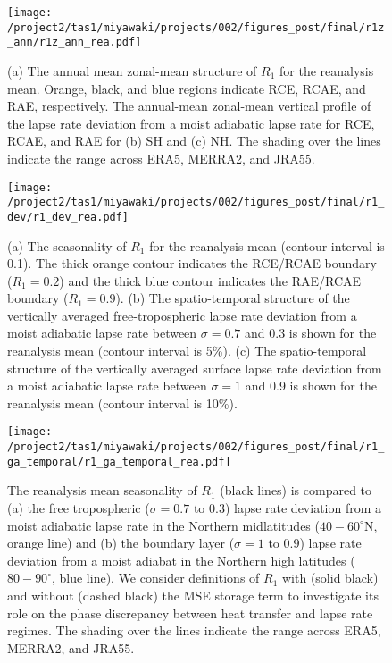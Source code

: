 \documentclass{ametsocV5}
\begin{document}
\begin{figure}[t]
  \noindent\texttt{[image: /project2/tas1/miyawaki/projects/002/figures\_post/final/r1z\_ann/r1z\_ann\_rea.pdf]}\\
  \caption{(a) The annual mean zonal-mean structure of $R_{1}$ for the reanalysis mean. Orange, black, and blue regions indicate RCE, RCAE, and RAE, respectively. The annual-mean zonal-mean vertical profile of the lapse rate deviation from a moist adiabatic lapse rate for RCE, RCAE, and RAE for (b) SH and (c) NH. The shading over the lines indicate the range across ERA5, MERRA2, and JRA55.}
  \label{fig:rea-r1-ann}
\end{figure}

\begin{figure}[t]
  \noindent\texttt{[image: /project2/tas1/miyawaki/projects/002/figures\_post/final/r1\_dev/r1\_dev\_rea.pdf]}\\
  \caption{(a) The seasonality of $R_{1}$ for the reanalysis mean (contour interval is 0.1). The thick orange contour indicates the RCE/RCAE boundary ($R_1=0.2$) and the thick blue contour indicates the RAE/RCAE boundary ($R_1 = 0.9$). (b) The spatio-temporal structure of the vertically averaged free-tropospheric lapse rate deviation from a moist adiabatic lapse rate between $\sigma=0.7$ and 0.3 is shown for the reanalysis mean (contour interval is 5\%). (c) The spatio-temporal structure of the vertically averaged surface lapse rate deviation from a moist adiabatic lapse rate between $\sigma=1$ and 0.9 is shown for the reanalysis mean (contour interval is 10\%).}
  \label{fig:rea-r1-dev}
\end{figure}

\begin{figure}[t]
  \noindent\texttt{[image: /project2/tas1/miyawaki/projects/002/figures\_post/final/r1\_ga\_temporal/r1\_ga\_temporal\_rea.pdf]}\\
  \caption{The reanalysis mean seasonality of $R_1$ (black lines) is compared to (a) the free tropospheric ($\sigma=0.7$ to 0.3) lapse rate deviation from a moist adiabatic lapse rate in the Northern midlatitudes ($40-60^\circ$N, orange line) and (b) the boundary layer ($\sigma=1$ to 0.9) lapse rate deviation from a moist adiabat in the Northern high latitudes ($80-90^\circ$, blue line). We consider definitions of $R_1$ with (solid black) and without (dashed black) the MSE storage term to investigate its role on the phase discrepancy between heat transfer and lapse rate regimes. The shading over the lines indicate the range across ERA5, MERRA2, and JRA55.}
  \label{fig:rea-r1-ga-temporal}
\end{figure}
\end{document}
